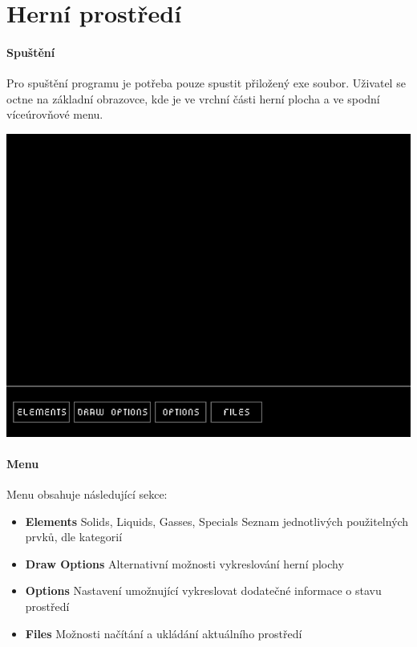 \documentclass[a4paper, 12pt]{article}
\begin{document}
\newpage
\section{Herní prostředí}
\paragraph{Spuštění}
Pro spuštění programu je potřeba pouze spustit přiložený exe soubor.
Uživatel se octne na základní obrazovce, kde je ve vrchní části herní plocha a
ve spodní víceúrovňové menu.

\begin{center}
   \includegraphics[width=0.9\linewidth]{img3.png}
\end{center}

\paragraph{Menu}
Menu obsahuje následující sekce:
\begin{itemize}
    \item \textbf{Elements}
    \subitem Solids, Liquids, Gasses, Specials
    \subsubitem Seznam jednotlivých použitelných prvků, dle kategorií 
\item \textbf{Draw Options}
    \subitem Alternativní možnosti vykreslování herní plochy
\item \textbf{Options}
    \subitem Nastavení umožnující vykreslovat dodatečné informace o stavu
    prostředí
\item \textbf{Files}
    \subitem Možnosti načítání a ukládání aktuálního prostředí

\end{itemize}
\newpage
\end{document}
